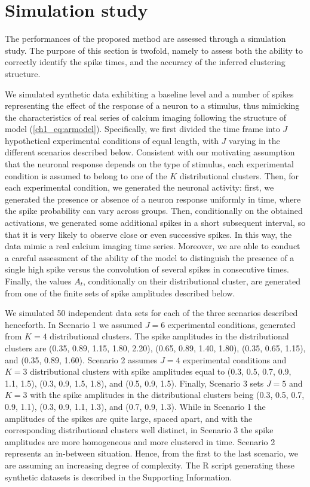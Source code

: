 \section{Simulation study}
\label{s:simulations}   

The performances of the proposed method are assessed through a simulation study. The purpose of this section is twofold, namely to assess both the ability to correctly identify the spike times, and the accuracy of the inferred clustering structure.  

We simulated synthetic data exhibiting a baseline level and a number of spikes representing the effect of the response of a neuron to a stimulus, thus mimicking the characteristics of real series of calcium imaging following the structure of model (\ref{ch1_eq:armodel}).
%
Specifically, we first divided the time frame into $J$ hypothetical experimental conditions of equal length, with $J$ varying in the different scenarios described below. Consistent with our motivating assumption that the neuronal response depends on the type of stimulus, each experimental condition is assumed to belong to one of the $K$ distributional clusters. Then, for each experimental condition, we generated the neuronal activity: first, we generated the presence or absence of a neuron response uniformly in time, where the spike probability can vary across groups. 
Then, conditionally on the obtained activations, we generated some additional spikes in a short subsequent interval, so that it is very likely to observe close or even successive spikes.
%
In this way, the data mimic a real calcium imaging time series. Moreover, we are able to conduct a careful assessment of the ability of the model to distinguish the presence of a single high spike versus the convolution of several spikes in consecutive times.
Finally, the values $A_t$, conditionally on their distributional cluster, are generated from one of the finite sets of spike amplitudes described below. 

We simulated 50 independent data sets for each of the three scenarios described henceforth. In Scenario 1 we assumed $J=6$ experimental conditions, generated from $K=4$ distributional clusters. 
%
The spike amplitudes in the distributional clusters are (0.35, 0.89, 1.15, 1.80, 2.20), (0.65, 0.89, 1.40, 1.80), (0.35, 0.65, 1.15), and (0.35, 0.89, 1.60).
%
Scenario 2 assumes $J=4$ experimental conditions and $K=3$ distributional clusters with spike amplitudes equal to (0.3, 0.5, 0.7, 0.9, 1.1, 1.5), (0.3, 0.9, 1.5, 1.8), and (0.5, 0.9, 1.5). 
%
Finally, Scenario 3 sets $J=5$ and $K=3$ with the spike amplitudes in the distributional clusters being (0.3, 0.5, 0.7, 0.9, 1.1), (0.3, 0.9, 1.1, 1.3), and (0.7, 0.9, 1.3). 
%
While in Scenario 1 the amplitudes of the spikes are quite large, spaced apart, and with the corresponding distributional clusters well distinct, in Scenario 3 the spike amplitudes are more homogeneous and more clustered in time. Scenario 2 represents an in-between situation. Hence, from the first to the last scenario, we are assuming an increasing degree of complexity. The R script generating these synthetic datasets is described in the Supporting Information.

